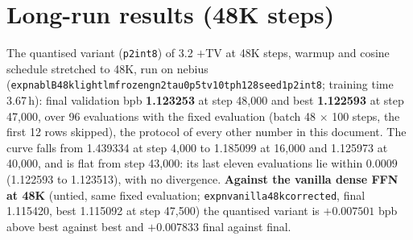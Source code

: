 \documentclass[10pt]{article}
\newcommand{\code}[1]{{\renewcommand{\_}{\textunderscore\allowbreak}\texttt{#1}}}
\begin{document}
\begin{center}
\end{center}

\section*{Long-run results (48K steps)}
The quantised variant (\code{p2\_int8}) of 3.2 $+$TV at 48K steps, warmup and cosine schedule stretched to 48K, run on nebius
(\code{exp\_n\_abl\_47\_B48k\_light\_lmfrozeng\_n2\_tau0p5\_tv10\_tph128\_seed1\_p2int8}; training time 3.67\,h):
final validation bpb \textbf{1.123253} at step 48,000 and best \textbf{1.122593} at step 47,000, over 96 evaluations with the fixed evaluation
(batch 48 $\times$ 100 steps, the first 12 rows skipped), the protocol of every other number in this document.
The curve falls from 1.439334 at step 4,000 to 1.185099 at 16,000 and 1.125973 at 40,000, and is flat from step 43,000:
its last eleven evaluations lie within $0.0009$ (1.122593 to 1.123513), with no divergence.
\textbf{Against the vanilla dense FFN at 48K} (untied, same fixed evaluation; \code{exp\_n\_0177\_vanilla48k\_corrected}, final 1.115420, best 1.115092 at step 47,500)
the quantised variant is $+0.007501$ bpb above best against best and $+0.007833$ final against final.
\end{document}
